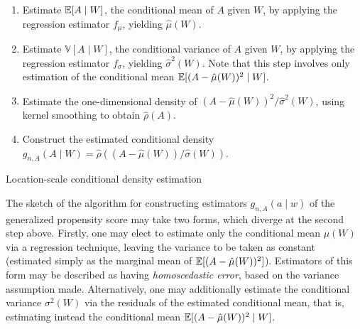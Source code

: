 \begin{algorithm}[H]
\label{alg:loc_scale_dens}
\SetAlgoLined
{}
\BlankLine
\begin{enumerate}
\itemsep4pt
\item Estimate $\mathbb{E}[A \mid W]$, the conditional mean of $A$ given $W$, by
  applying the regression estimator $f_{\mu}$, yielding $\hat{\mu}(W)$.
\item Estimate $\mathbb{V}[A \mid W]$, the conditional variance of $A$ given
  $W$, by applying the regression estimator $f_{\sigma}$, yielding
  $\hat{\sigma}^2(W)$. Note that this step involves only estimation of the
  conditional mean $\mathbb{E}[(A - \hat{\mu}(W))^2 \mid W]$.
\item Estimate the one-dimensional density of $(A - \hat{\mu}(W))^2
  / \hat{\sigma}^2(W)$, using kernel smoothing to obtain $\hat{\rho}(A)$.
\item Construct the estimated conditional density $g_{n,A}(A \mid W)
  = \hat{\rho}((A - \hat{\mu}(W)) / \hat{\sigma}(W))$.
\end{enumerate}
\BlankLine
{}
\caption{Location-scale conditional density estimation}
\end{algorithm}

The sketch of the algorithm for constructing estimators $g_{n,A}(a \mid w)$ of
the generalized propensity score may take two forms, which diverge at the second
step above. Firstly, one may elect to estimate only the conditional mean
$\mu(W)$ via a regression technique, leaving the variance to be taken as
constant (estimated simply as the marginal mean of $\mathbb{E}[(A - \hat{\mu}(W))^2]$).
Estimators of this form may be described as having \textit{homoscedastic error},
based on the variance assumption made. Alternatively, one may additionally
estimate the conditional variance $\sigma^2(W)$ via the residuals of the
estimated conditional mean, that is, estimating instead the conditional mean
$\mathbb{E}[(A - \hat{\mu}(W))^2 \mid W]$.

